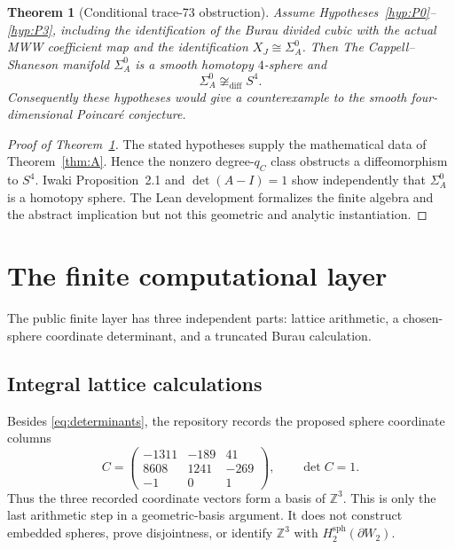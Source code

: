 \documentclass[11pt]{amsart}
\newtheorem{theorem}{Theorem}[section]
\theoremstyle{definition}
\theoremstyle{remark}
\newcommand{\Z}{\mathbb{Z}}
\begin{document}
\begin{theorem}[Conditional trace-73 obstruction]\label{thm:joined}
Assume Hypotheses~\ref{hyp:P0}--\ref{hyp:P3}, including the identification of
the Burau divided cubic with the actual MWW coefficient map and the
identification $X_J\cong\Sigma_A^0$.  Then
The Cappell--Shaneson manifold $\Sigma_A^0$ is a smooth homotopy $4$-sphere
and
\[
\Sigma_A^0\not\cong_{\mathrm{diff}}S^4.
\]
Consequently these hypotheses would give a counterexample to the smooth
four-dimensional Poincar\'e conjecture.
\end{theorem}

\begin{proof}[Proof of Theorem~\ref{thm:joined}]
The stated hypotheses supply the mathematical data of Theorem~\ref{thm:A}.  Hence
the nonzero degree-$q_C$ class obstructs a diffeomorphism to $S^4$.
Iwaki Proposition~2.1 and $\det(A-I)=1$ show independently that
$\Sigma_A^0$ is a homotopy sphere.  The Lean development formalizes the
finite algebra and the abstract implication but not this geometric and
analytic instantiation.
\end{proof}



\section{The finite computational layer}

The public finite layer has three independent parts: lattice arithmetic, a
chosen-sphere coordinate determinant, and a truncated Burau calculation.

\subsection{Integral lattice calculations}

Besides \eqref{eq:determinants}, the repository records the proposed sphere
coordinate columns
\begin{equation}\label{eq:spherecols}
C=\begin{pmatrix}
-1311&-189&41\\
8608&1241&-269\\
-1&0&1
\end{pmatrix},
\qquad \det C=1.
\end{equation}
Thus the three recorded coordinate vectors form a basis of $\Z^3$.  This is
only the last arithmetic step in a geometric-basis argument.  It does not
construct embedded spheres, prove disjointness, or identify $\Z^3$ with
$H_2^{\mathrm{sph}}(\partial W_2)$.
\end{document}
